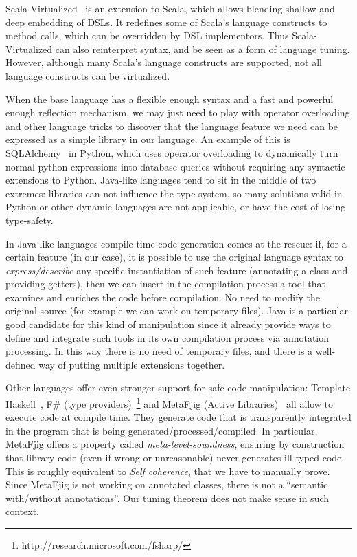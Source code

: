 Scala-Virtualized~\cite{Rompf2012scalavirtualized} is an extension to Scala,
which allows blending shallow and deep embedding of DSLs. It redefines
some of Scala's language constructs to method calls,
which can be overridden by DSL implementors. Thus Scala-Virtualized
can also reinterpret syntax, and be seen as a form of language tuning.
However, although many Scala's language constructs are supported,
not all language constructs can be virtualized.



When the base language has a flexible enough syntax and a fast and
powerful enough reflection mechanism, we may just need to play with
operator overloading and other language tricks to discover that the
language feature we need can be expressed as a simple library in our
language. An example of this is SQLAlchemy~\cite{bayer2012sqlalchemy} in
Python, which uses operator overloading to dynamically turn normal python expressions into database queries
without requiring any syntactic extensions to Python.
Java-like languages tend to sit in the middle of two extremes:
libraries can not influence the type system, so many solutions valid
in Python or other dynamic languages are not applicable, or have the
cost of losing type-safety.

In Java-like languages compile time code generation comes at the rescue: if, for a certain feature
(\mixin in our case), it is possible to use the original language syntax to
\emph{express/describe} any specific instantiation of such feature (annotating a
class and providing getters), then we can insert in the compilation process a tool
that examines and enriches the code before compilation. No need to modify the
original source (for example we can work on temporary files).
Java is a particular
good candidate for this kind of manipulation since it already provide ways to
define and integrate such tools in its own compilation process via annotation
processing. In this way
there is no need of temporary files, and there is a well-defined way of putting
multiple extensions together.

Other languages offer even stronger support for safe code manipulation:
Template Haskell~\cite{sheard2002template}, F\# (type providers)~\footnote{http://research.microsoft.com/fsharp/} and MetaFjig (Active Libraries)~\cite{servetto2010metafjig}
all allow to execute code at compile time. They generate code that is
transparently integrated in the program that is being
generated/processed/compiled. In particular, MetaFjig offers a property called
\emph{meta-level-soundness}, ensuring by construction that library code (even if wrong or unreasonable) never generates ill-typed code. This is roughly equivalent to
\textit{Self coherence}, that we have to manually prove.
Since MetaFjig is not working on annotated classes, there is not a ``semantic with/without annotations''. Our \mixin tuning theorem does not make sense in such context.

